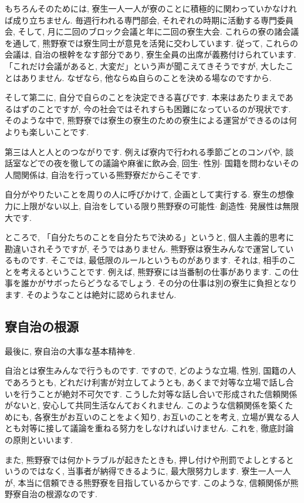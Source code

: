 \documentclass[10pt,b5jsbook,dvips,dvipdfmx,openany]{jsbook}
\theoremstyle{definition}
\begin{document}
		もちろんそのためには, 寮生一人一人が寮のことに積極的に関わっていかなければ成り立ちません. 毎週行われる専門部会, それぞれの時期に活動する専門委員会, そして, 月に二回のブロック会議と年に二回の寮生大会. これらの寮の諸会議を通して, 熊野寮では寮生同士が意見を活発に交わしています. 従って, これらの会議は, 自治の根幹をなす部分であり, 寮生全員の出席が義務付けられています. 「これだけ会議があると, 大変だ」という声が聞こえてきそうですが, 大したことはありません. なぜなら, 他ならぬ自らのことを決める場なのですから. 

 		そして第二に, 自分で自らのことを決定できる喜びです. 本来はあたりまえであるはずのことですが, 今の社会ではそれすらも困難になっているのが現状です. そのような中で, 熊野寮では寮生の寮生のための寮生による運営ができるのは何よりも楽しいことです. 

 		第三は人と人とのつながりです. 例えば寮内で行われる季節ごとのコンパや, 談話室などでの夜を徹しての議論や麻雀に飲み会, 回生$ \cdot $ 性別$ \cdot $ 国籍を問わないその人間関係は, 自治を行っている熊野寮だからこそです. 

		自分がやりたいことを周りの人に呼びかけて, 企画として実行する. 寮生の想像力に上限がない以上, 自治をしている限り熊野寮の可能性$ \cdot $ 創造性$ \cdot $ 発展性は無限大です. 

		ところで, 「自分たちのことを自分たちで決める」というと, 個人主義的思考に勘違いされそうですが, そうではありません. 熊野寮は寮生みんなで運営しているものです. そこでは, 最低限のルールというものがあります. それは, 相手のことを考えるということです. 例えば, 熊野寮には当番制の仕事があります. この仕事を誰かがサボったらどうなるでしょう. その分の仕事は別の寮生に負担となります. そのようなことは絶対に認められません. 

		\subsection{寮自治の根源}

		 最後に, 寮自治の大事な基本精神を. 

 		自治とは寮生みんなで行うものです. ですので, どのような立場, 性別, 国籍の人であろうとも, どれだけ利害が対立してようとも, あくまで対等な立場で話し合いを行うことが絶対不可欠です. こうした対等な話し合いで形成された信頼関係がないと, 安心して共同生活なんておくれません. このような信頼関係を築くためにも, 各寮生がお互いのことをよく知り, お互いのことを考え, 立場が異なる人とも対等に接して議論を重ねる努力をしなければいけません. これを, 徹底討論の原則といいます.  

		また, 熊野寮では何かトラブルが起きたときも, 押し付けや刑罰でよしとするというのではなく, 当事者が納得できるように, 最大限努力します. 寮生一人一人が, 本当に信頼できる熊野寮を目指しているからです. このような, 信頼関係が熊野寮自治の根源なのです. 
\end{document}
